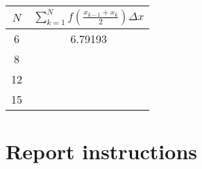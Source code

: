 \begin{center}
  \begin{tabular}{cc}
    \toprule
    \rule[-8pt]{0pt}{14pt}
    $N$ & $\sum_{k = 1}^{N} f\left(\frac{x_{k-1} + x_k}{2}\right)\Delta x$\\
    \toprule
    6 & 6.79193 \\ \midrule
    8 & \\ \midrule
    12 & \\ \midrule
    15 & \\ \bottomrule
  \end{tabular}
\end{center}



\section{Report instructions}

